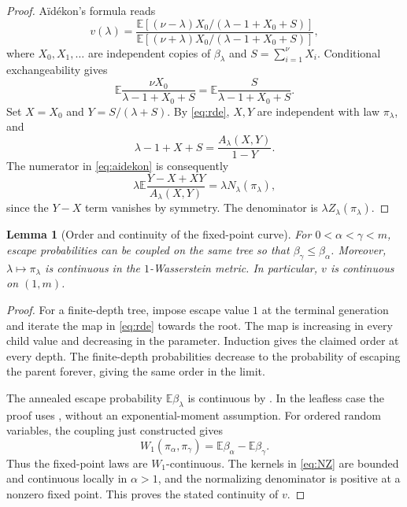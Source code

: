 \documentclass[11pt,a4paper]{article}
\numberwithin{equation}{section}
\theoremstyle{notethm}
\newtheorem{lemma}[lemma]{Lemma}
\theoremstyle{definition}
\newcommand{\E}{\mathbb E}
\begin{document}
\begin{proof}
A\"id\'ekon's formula \cite[Theorem~1.1]{Aidekon} reads
\begin{equation}\label{eq:aidekon}
 v(\lambda)=
 \frac{\E[(\nu-\lambda)X_0/(\lambda-1+X_0+S)]}
      {\E[(\nu+\lambda)X_0/(\lambda-1+X_0+S)]},
\end{equation}
where $X_0,X_1,\ldots$ are independent copies of $\beta_\lambda$ and
$S=\sum_{i=1}^{\nu}X_i$. Conditional exchangeability gives
\begin{equation}\label{eq:exchange-speed}
 \E\frac{\nu X_0}{\lambda-1+X_0+S}
 =\E\frac{S}{\lambda-1+X_0+S}.
\end{equation}
Set $X=X_0$ and $Y=S/(\lambda+S)$. By \eqref{eq:rde}, $X,Y$ are independent
with law $\pi_\lambda$, and
\begin{equation}\label{eq:denom-change}
 \lambda-1+X+S=\frac{A_\lambda(X,Y)}{1-Y}.
\end{equation}
The numerator in \eqref{eq:aidekon} is consequently
\[
 \lambda\E\frac{Y-X+XY}{A_\lambda(X,Y)}
 =\lambda N_\lambda(\pi_\lambda),
\]
since the $Y-X$ term vanishes by symmetry. The denominator is
$\lambda Z_\lambda(\pi_\lambda)$.
\end{proof}

\begin{lemma}[Order and continuity of the fixed-point curve]\label{lem:continuity}
For $0<\alpha<\gamma<m$, escape probabilities can be coupled on the same tree
so that $\beta_\gamma\le\beta_\alpha$. Moreover,
$\lambda\mapsto\pi_\lambda$ is continuous in the $1$-Wasserstein metric.
In particular, $v$ is continuous on $(1,m)$.
\end{lemma}

\begin{proof}
For a finite-depth tree, impose escape value $1$ at the terminal generation
and iterate the map in \eqref{eq:rde} towards the root. The map is increasing
in every child value and decreasing in the parameter. Induction gives the
claimed order at every depth. The finite-depth probabilities decrease to
the probability of escaping the parent forever, giving the same order in
the limit.

The annealed escape probability $\E\beta_\lambda$ is continuous by
\cite[Proposition~2.9]{BT}. In the leafless case the proof uses
\cite[Lemma~4.7]{BT}, without an exponential-moment assumption. For ordered
random variables, the coupling just constructed gives
\begin{equation}\label{eq:W1}
 W_1(\pi_\alpha,\pi_\gamma)
 =\E\beta_\alpha-\E\beta_\gamma.
\end{equation}
Thus the fixed-point laws are $W_1$-continuous. The kernels in
\eqref{eq:NZ} are bounded and continuous locally in $\alpha>1$, and the
normalizing denominator is positive at a nonzero fixed point. This proves
the stated continuity of $v$.
\end{proof}
\end{document}
